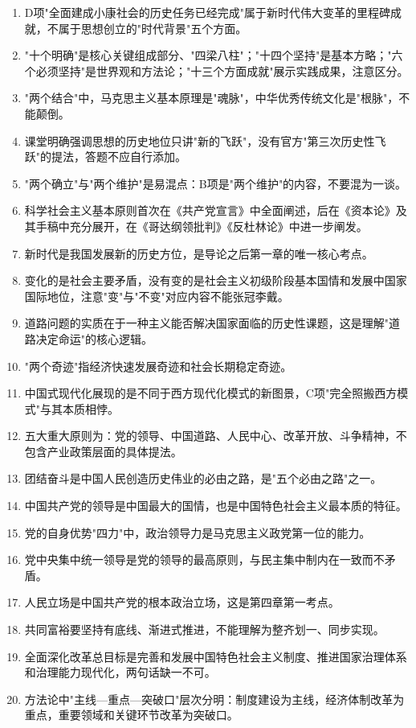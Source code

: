 \documentclass[12pt, a4paper]{article}
\begin{document}
\begin{answerbox}
\begin{enumerate}[itemsep=2pt, topsep=4pt, leftmargin=1.6em]
\item D项"全面建成小康社会的历史任务已经完成"属于新时代伟大变革的里程碑成就，不属于思想创立的"时代背景"五个方面。
\item "十个明确"是核心关键组成部分、"四梁八柱"；"十四个坚持"是基本方略；"六个必须坚持"是世界观和方法论；"十三个方面成就"展示实践成果，注意区分。
\item "两个结合"中，马克思主义基本原理是"魂脉"，中华优秀传统文化是"根脉"，不能颠倒。
\item 课堂明确强调思想的历史地位只讲"新的飞跃"，没有官方"第三次历史性飞跃"的提法，答题不应自行添加。
\item "两个确立"与"两个维护"是易混点：B项是"两个维护"的内容，不要混为一谈。
\item 科学社会主义基本原则首次在《共产党宣言》中全面阐述，后在《资本论》及其手稿中充分展开，在《哥达纲领批判》《反杜林论》中进一步阐发。
\item 新时代是我国发展新的历史方位，是导论之后第一章的唯一核心考点。
\item 变化的是社会主要矛盾，没有变的是社会主义初级阶段基本国情和发展中国家国际地位，注意"变"与"不变"对应内容不能张冠李戴。
\item 道路问题的实质在于一种主义能否解决国家面临的历史性课题，这是理解"道路决定命运"的核心逻辑。
\item "两个奇迹"指经济快速发展奇迹和社会长期稳定奇迹。
\item 中国式现代化展现的是不同于西方现代化模式的新图景，C项"完全照搬西方模式"与其本质相悖。
\item 五大重大原则为：党的领导、中国道路、人民中心、改革开放、斗争精神，不包含产业政策层面的具体提法。
\item 团结奋斗是中国人民创造历史伟业的必由之路，是"五个必由之路"之一。
\item 中国共产党的领导是中国最大的国情，也是中国特色社会主义最本质的特征。
\item 党的自身优势"四力"中，政治领导力是马克思主义政党第一位的能力。
\item 党中央集中统一领导是党的领导的最高原则，与民主集中制内在一致而不矛盾。
\item 人民立场是中国共产党的根本政治立场，这是第四章第一考点。
\item 共同富裕要坚持有底线、渐进式推进，不能理解为整齐划一、同步实现。
\item 全面深化改革总目标是完善和发展中国特色社会主义制度、推进国家治理体系和治理能力现代化，两句话缺一不可。
\item 方法论中"主线—重点—突破口"层次分明：制度建设为主线，经济体制改革为重点，重要领域和关键环节改革为突破口。

\end{enumerate}
\end{answerbox}
\end{document}
